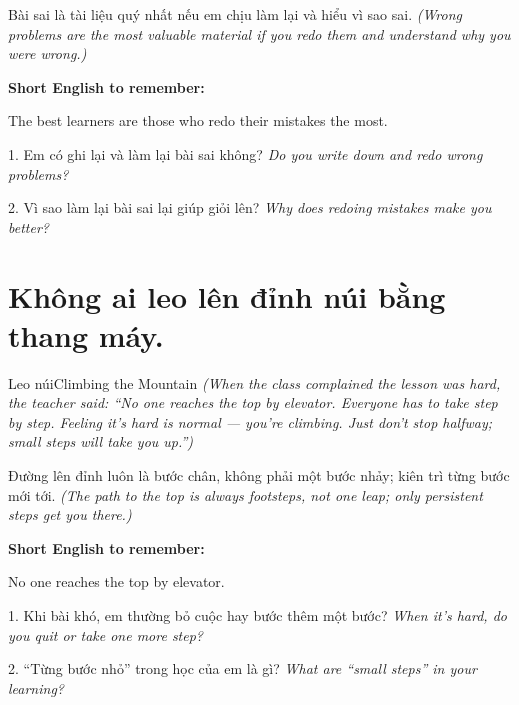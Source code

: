 \begin{baihoc}
Bài sai là tài liệu quý nhất nếu em chịu làm lại và hiểu vì sao sai.
\textit{(Wrong problems are the most valuable material if you redo them and understand why you were wrong.)}
\end{baihoc}

\begin{ghinhoanh}
\textbf{Short English to remember:}

The best learners are those who redo their mistakes the most.

\end{ghinhoanh}

\begin{tuhocnhanh}
1. Em có ghi lại và làm lại bài sai không? \textit{Do you write down and redo wrong problems?}

2. Vì sao làm lại bài sai lại giúp giỏi lên? \textit{Why does redoing mistakes make you better?}
\end{tuhocnhanh}
\ngancach

\section{Không ai leo lên đỉnh núi bằng thang máy.}
\begin{truyen}{Leo núi}{Climbing the Mountain}
\textit{(When the class complained the lesson was hard, the teacher said: ``No one reaches the top by elevator. Everyone has to take step by step. Feeling it's hard is normal — you're climbing. Just don't stop halfway; small steps will take you up.'')}
\end{truyen}

\begin{baihoc}
Đường lên đỉnh luôn là bước chân, không phải một bước nhảy; kiên trì từng bước mới tới.
\textit{(The path to the top is always footsteps, not one leap; only persistent steps get you there.)}
\end{baihoc}

\begin{ghinhoanh}
\textbf{Short English to remember:}

No one reaches the top by elevator.

\end{ghinhoanh}

\begin{tuhocnhanh}
1. Khi bài khó, em thường bỏ cuộc hay bước thêm một bước? \textit{When it's hard, do you quit or take one more step?}

2. ``Từng bước nhỏ'' trong học của em là gì? \textit{What are ``small steps'' in your learning?}
\end{tuhocnhanh}
\ngancach

